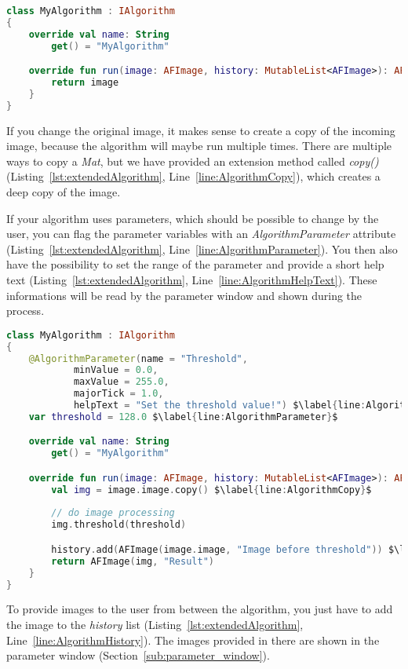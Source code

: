 \begin{lstlisting}[caption={Basic version of an algorithm.}, label={lst:basicAlgorithm}, language=Kotlin]
class MyAlgorithm : IAlgorithm
{
    override val name: String
        get() = "MyAlgorithm"

    override fun run(image: AFImage, history: MutableList<AFImage>): AFImage {
        return image
    }
}
\end{lstlisting}

If you change the original image, it makes sense to create a copy of the incoming image, because the algorithm will maybe run multiple times. There are multiple ways to copy a \textit{Mat}, but we have provided an extension method called \textit{copy()} (Listing~\ref{lst:extendedAlgorithm}, Line~\ref{line:AlgorithmCopy}), which creates a deep copy of the image.

If your algorithm uses parameters, which should be possible to change by the user, you can flag the parameter variables with an \textit{AlgorithmParameter} attribute (Listing~\ref{lst:extendedAlgorithm}, Line~\ref{line:AlgorithmParameter}). You then also have the possibility to set the range of the parameter and provide a short help text (Listing~\ref{lst:extendedAlgorithm}, Line~\ref{line:AlgorithmHelpText}). These informations will be read by the parameter window and shown during the process.

\begin{lstlisting}[caption={Extended version of an algorithm.}, label={lst:extendedAlgorithm}, language=Kotlin, escapechar=$]
class MyAlgorithm : IAlgorithm
{
    @AlgorithmParameter(name = "Threshold",
            minValue = 0.0,
            maxValue = 255.0,
            majorTick = 1.0,
            helpText = "Set the threshold value!") $\label{line:AlgorithmHelpText}$
    var threshold = 128.0 $\label{line:AlgorithmParameter}$

    override val name: String
        get() = "MyAlgorithm"

    override fun run(image: AFImage, history: MutableList<AFImage>): AFImage {
        val img = image.image.copy() $\label{line:AlgorithmCopy}$
        
        // do image processing
        img.threshold(threshold)

        history.add(AFImage(image.image, "Image before threshold")) $\label{line:AlgorithmHistory}$
        return AFImage(img, "Result")
    }
}
\end{lstlisting}

To provide images to the user from between the algorithm, you just have to add the image to the \textit{history} list (Listing~\ref{lst:extendedAlgorithm}, Line~\ref{line:AlgorithmHistory}). The images provided in there are shown in the parameter window (Section~\ref{sub:parameter_window}).

